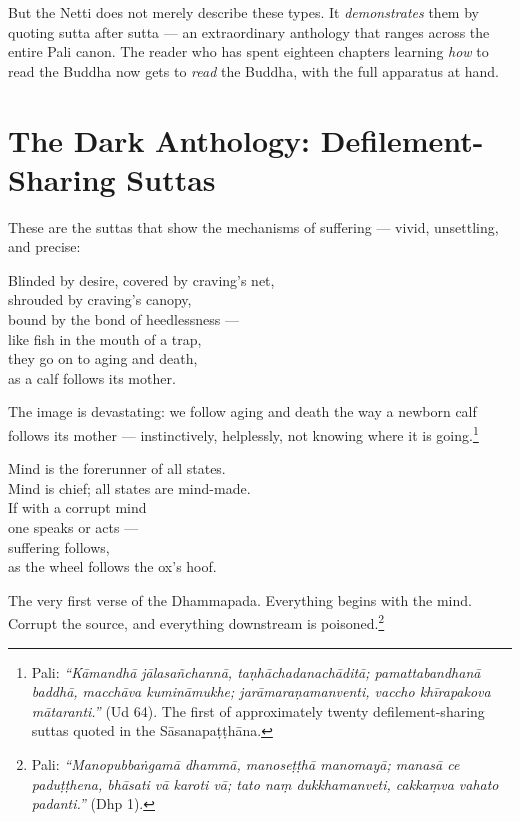 But the Netti does not merely describe these types. It \textit{demonstrates} them by quoting sutta after sutta --- an extraordinary anthology that ranges across the entire Pali canon. The reader who has spent eighteen chapters learning \textit{how} to read the Buddha now gets to \textit{read} the Buddha, with the full apparatus at hand.

\section*{The Dark Anthology: Defilement-Sharing Suttas}

These are the suttas that show the mechanisms of suffering --- vivid, unsettling, and precise:

\begin{versebox}
Blinded by desire, covered by craving's net,\\
shrouded by craving's canopy,\\
bound by the bond of heedlessness ---\\
like fish in the mouth of a trap,\\
they go on to aging and death,\\
as a calf follows its mother.
\end{versebox}

\noindent The image is devastating: we follow aging and death the way a newborn calf follows its mother --- instinctively, helplessly, not knowing where it is going.\footnote{Pali: \textit{``Kāmandhā jālasañchannā, taṇhāchadanachāditā; pamattabandhanā baddhā, macchāva kumināmukhe; jarāmaraṇamanventi, vaccho khīrapakova mātaranti.''} (Ud 64). The first of approximately twenty defilement-sharing suttas quoted in the Sāsanapaṭṭhāna.}

\begin{versebox}
Mind is the forerunner of all states.\\
Mind is chief; all states are mind-made.\\
If with a corrupt mind\\
one speaks or acts ---\\
suffering follows,\\
as the wheel follows the ox's hoof.
\end{versebox}

\noindent The very first verse of the Dhammapada. Everything begins with the mind. Corrupt the source, and everything downstream is poisoned.\footnote{Pali: \textit{``Manopubbaṅgamā dhammā, manoseṭṭhā manomayā; manasā ce paduṭṭhena, bhāsati vā karoti vā; tato naṃ dukkhamanveti, cakkaṃva vahato padanti.''} (Dhp 1).}

